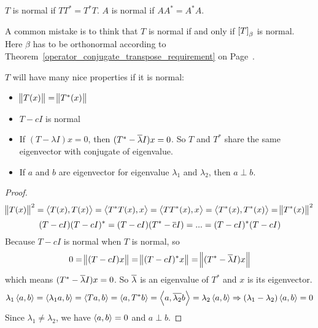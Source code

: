 \begin{definition}[Normal]
    $T$ is normal if $TT^* = T^* T$. $A$ is normal if $AA^* = A^* A$.
\end{definition}

A common mistake is to think that $T$ is normal if and only if $\coordinate{T}_\beta$ is normal. Here $\beta$ has to be orthonormal according to Theorem~\ref{operator_conjugate_transpose_requirement} on Page~\pageref{operator_conjugate_transpose_requirement}.

$T$ will have many nice properties if it is normal:
\begin{itemize}
    \item $\norm{T(x)} = \norm{T^* (x)}$
    \item $T - cI$ is normal
    \item If $(T - \lambda I)x = 0$, then $(T^* - \overline{\lambda}I)x = 0$. So $T$ and $T^*$ share the same eigenvector with conjugate of eigenvalue.
    \item If $a$ and $b$ are eigenvector for eigenvalue $\lambda_1$ and $\lambda_2$, then $a \perp b$.
\end{itemize}
\begin{proof}
    \begin{equation*}
        \norm{T(x)}^2 = \left\langle \displaystyle T(x), T(x) \right\rangle = \left\langle \displaystyle T^*T(x), x \right\rangle = \left\langle \displaystyle TT^*(x), x \right\rangle = \left\langle \displaystyle T^*(x), T^*(x) \right\rangle = \norm{T^*(x)}^2
    \end{equation*}
    \begin{equation*}
        (T-cI)(T-cI)^* = (T-cI)(T^* - \overline{c}I) = ... = (T-cI)^*(T-cI)
    \end{equation*}
    Because $T-cI$ is normal when $T$ is normal, so
    \begin{equation*}
        0 = \norm{(T-cI)x} = \norm{(T-cI)^* x} =  \norm{(T^*- \overline{\lambda} I)x}
    \end{equation*}
    which means $(T^*- \overline{\lambda} I)x = 0$. So $\overline{\lambda}$ is an eigenvalue of $T^*$ and $x$ is its eigenvector.
    \begin{equation*}
        \lambda_1 \left\langle \displaystyle a, b \right\rangle = \left\langle \displaystyle \lambda_1 a, b \right\rangle = \left\langle \displaystyle Ta, b \right\rangle = \left\langle \displaystyle a, T^*b \right\rangle = \left\langle \displaystyle a, \overline{\lambda_2}b \right\rangle = \lambda_2 \left\langle \displaystyle a, b \right\rangle \Rightarrow (\lambda_1 - \lambda_2)\left\langle \displaystyle a, b \right\rangle = 0
    \end{equation*}
    Since $\lambda_1 \neq \lambda_2$, we have $\left\langle \displaystyle a, b \right\rangle = 0$ and $a \perp b$.
\end{proof}


